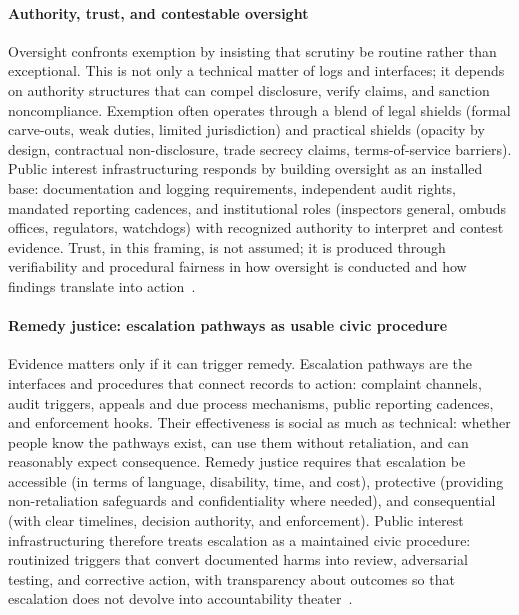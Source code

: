 \documentclass[acmsmall,screen]{acmart}
\begin{document}
\paragraph*{Authority, trust, and contestable oversight}
Oversight confronts exemption by insisting that scrutiny be routine rather than exceptional. This is not only a technical matter of logs and interfaces; it depends on authority structures that can compel disclosure, verify claims, and sanction noncompliance. Exemption often operates through a blend of legal shields (formal carve-outs, weak duties, limited jurisdiction) and practical shields (opacity by design, contractual non-disclosure, trade secrecy claims, terms-of-service barriers). Public interest infrastructuring responds by building oversight as an installed base: documentation and logging requirements, independent audit rights, mandated reporting cadences, and institutional roles (inspectors general, ombuds offices, regulators, watchdogs) with recognized authority to interpret and contest evidence. Trust, in this framing, is not assumed; it is produced through verifiability and procedural fairness in how oversight is conducted and how findings translate into action~\cite{pasquale_black_2016,Halavais_Overcomingtermsservice_2019,hutchinsonAccountabilityMachineLearning2021}.

\paragraph*{Remedy justice: escalation pathways as usable civic procedure}
Evidence matters only if it can trigger remedy. Escalation pathways are the interfaces and procedures that connect records to action: complaint channels, audit triggers, appeals and due process mechanisms, public reporting cadences, and enforcement hooks. Their effectiveness is social as much as technical: whether people know the pathways exist, can use them without retaliation, and can reasonably expect consequence. Remedy justice requires that escalation be accessible (in terms of language, disability, time, and cost), protective (providing non-retaliation safeguards and confidentiality where needed), and consequential (with clear timelines, decision authority, and enforcement). Public interest infrastructuring therefore treats escalation as a maintained civic procedure: routinized triggers that convert documented harms into review, adversarial testing, and corrective action, with transparency about outcomes so that escalation does not devolve into accountability theater~\cite{hutchinsonAccountabilityMachineLearning2021,pasquale_black_2016}.
\end{document}
